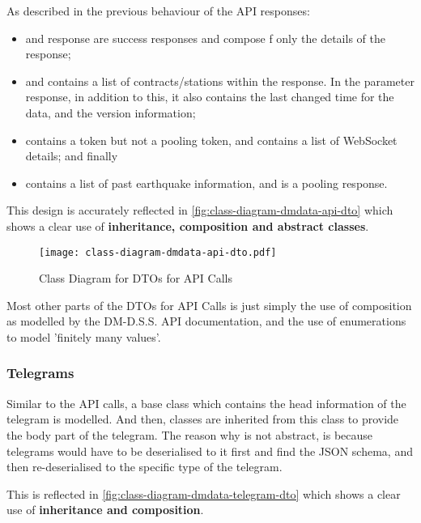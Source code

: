 As described in the previous behaviour of the API responses:
\begin{itemize}
    \item {} and  response are success responses and compose f only the details of the response;
    \item {} and  contains a list of contracts/stations within the response. In the parameter response, in addition to this, it also contains the last changed time for the data, and the version information;
    \item {} contains a token but not a pooling token, and contains a list of WebSocket details; and finally
    \item {} contains a list of past earthquake information, and is a pooling response.
\end{itemize}

This design is accurately reflected in \autoref{fig:class-diagram-dmdata-api-dto} which shows a clear use of \textbf{inheritance, composition and abstract classes}.

\begin{figure}[htp]
    \centering
    \texttt{[image: class-diagram-dmdata-api-dto.pdf]}
    \caption{Class Diagram for DTOs for API Calls}
    \label{fig:class-diagram-dmdata-api-dto}
\end{figure}

Most other parts of the DTOs for API Calls is just simply the use of composition as modelled by the DM-D.S.S. API documentation, and the use of enumerations to model 'finitely many values'.

\subsubsection{Telegrams}

Similar to the API calls, a base class  which contains the head information of the telegram is modelled. And then, classes are inherited from this class to provide the body part of the telegram. The reason why  is not abstract, is because telegrams would have to be deserialised to it first and find the JSON schema, and then re-deserialised to the specific type of the telegram.

This is reflected in \autoref{fig:class-diagram-dmdata-telegram-dto} which shows a clear use of \textbf{inheritance and composition}.

